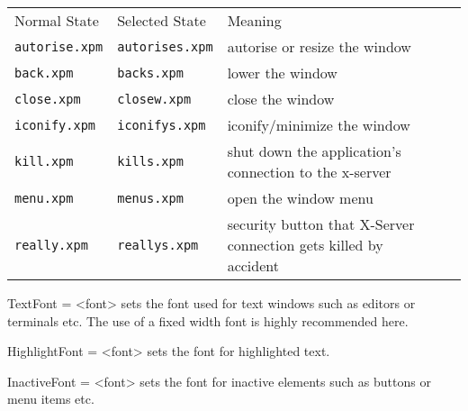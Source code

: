 \documentclass[10pt,a4paper]{article}
\newenvironment{ttdesc}[1]{
   \begin{list}{}{
          \renewcommand{\makelabel}[1]{\texttt{##1\hfill}}}}{\end{list}}
\begin{document}
\begin{ttdesc}{description}
\begin{tabular}{ll p{5cm}l}
Normal State & Selected State & Meaning\\
\texttt{autorise.xpm} & \texttt{autorises.xpm} & autorise or resize the window\\
\texttt{back.xpm} & \texttt{backs.xpm} & lower the window \\
\texttt{close.xpm} & \texttt{closew.xpm} & close the window \\
\texttt{iconify.xpm} & \texttt{iconifys.xpm}& iconify/minimize the window\\
\texttt{kill.xpm} & \texttt{kills.xpm} & shut down the application's connection to the x-server \\
\texttt{menu.xpm} & \texttt{menus.xpm} & open the window menu\\
\texttt{really.xpm} & \texttt{reallys.xpm} & security button that X-Server connection gets killed by accident \\
\end{tabular}

\item[TextFont = <font>] sets the font used for text windows such as editors or terminals etc. The use of a fixed width font is highly recommended here.
\item[HighlightFont = <font>] sets the font for highlighted text.
\item[InactiveFont = <font>] sets the font for inactive elements such as buttons or menu items etc.

\end{ttdesc}
\end{document}
